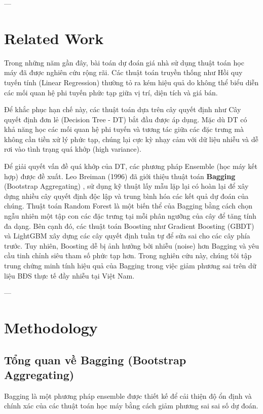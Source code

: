 \documentclass[sigconf]{acmart}
\begin{document}
---

\section{Related Work}
Trong những năm gần đây, bài toán dự đoán giá nhà sử dụng thuật toán học máy đã được nghiên cứu rộng rãi. Các thuật toán truyền thống như Hồi quy tuyến tính (Linear Regression) thường tỏ ra kém hiệu quả do không thể biểu diễn các mối quan hệ phi tuyến phức tạp giữa vị trí, diện tích và giá bán.

Để khắc phục hạn chế này, các thuật toán dựa trên cây quyết định như Cây quyết định đơn lẻ (Decision Tree - DT) bắt đầu được áp dụng. Mặc dù DT có khả năng học các mối quan hệ phi tuyến và tương tác giữa các đặc trưng mà không cần tiền xử lý phức tạp, chúng lại cực kỳ nhạy cảm với dữ liệu nhiễu và dễ rơi vào tình trạng quá khớp (high variance). 

Để giải quyết vấn đề quá khớp của DT, các phương pháp Ensemble (học máy kết hợp) được đề xuất. Leo Breiman (1996) đã giới thiệu thuật toán \textbf{Bagging} (Bootstrap Aggregating) \cite{breiman1996bagging}, sử dụng kỹ thuật lấy mẫu lặp lại có hoàn lại để xây dựng nhiều cây quyết định độc lập và trung bình hóa các kết quả dự đoán của chúng. Thuật toán Random Forest \cite{breiman2001randomforest} là một biến thể của Bagging bằng cách chọn ngẫu nhiên một tập con các đặc trưng tại mỗi phân ngưỡng của cây để tăng tính đa dạng. Bên cạnh đó, các thuật toán Boosting như Gradient Boosting (GBDT) và LightGBM \cite{ke2017lightgbm} xây dựng các cây quyết định tuần tự để sửa sai cho các cây phía trước. Tuy nhiên, Boosting dễ bị ảnh hưởng bởi nhiễu (noise) hơn Bagging và yêu cầu tinh chỉnh siêu tham số phức tạp hơn. Trong nghiên cứu này, chúng tôi tập trung chứng minh tính hiệu quả của Bagging trong việc giảm phương sai trên dữ liệu BĐS thực tế đầy nhiễu tại Việt Nam.

---

\section{Methodology}

\subsection{Tổng quan về Bagging (Bootstrap Aggregating)}
Bagging là một phương pháp ensemble được thiết kế để cải thiện độ ổn định và chính xác của các thuật toán học máy bằng cách giảm phương sai sai số dự đoán. 
\end{document}
